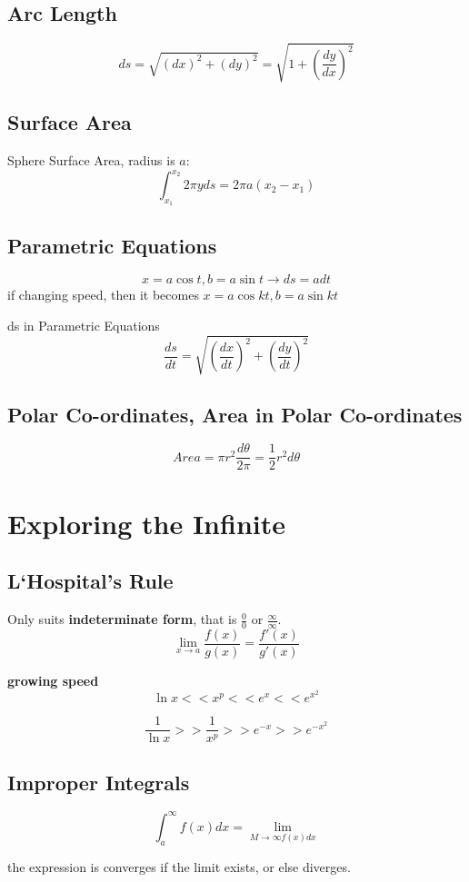 \documentclass{article}
\newcommand\limitx[1]{\lim_{x \to #1}}
\begin{document}
\subsection{Arc Length}

$$ds = \sqrt{(dx)^2 + (dy)^2} = \sqrt{1 + (\frac{dy}{dx})^2}$$

\subsection{Surface Area}
Sphere Surface Area, radius is $a$:
$$\int_{x_1}^{x_2} 2\pi yds = 2\pi a(x_2-x_1)$$

\subsection{Parametric Equations}
$$ x = a\cos t, b = a\sin t \rightarrow ds = adt$$
if changing speed, then it becomes $x = a\cos kt, b = a\sin kt$

ds in Parametric Equations
$$\frac{ds}{dt} = \sqrt{(\frac{dx}{dt})^2 + (\frac{dy}{dt})^2}$$

\subsection{Polar Co-ordinates, Area in Polar Co-ordinates}
$$Area = \pi r^2\frac{d\theta}{2\pi} = \frac{1}{2}r^2d\theta$$

\section{Exploring the Infinite}
\subsection{L‘Hospital's Rule}
Only suits \textbf{indeterminate form}, that is $\frac{0}{0}$ or $\frac{\infty}{\infty}$.
$$\limitx{a} \frac{f(x)}{g(x)} = \frac{f'(x)}{g'(x)}$$

\textbf{growing speed}
$$\ln x << x^p << e^x << e^{x^2}$$

$$\frac{1}{\ln x} >> \frac{1}{x^p} >> e^{-x} >> e^{-x^2}$$

\subsection{Improper Integrals}
$$\int_a^\infty f(x)dx = \lim_{M \rightarrow \infty f(x)dx}$$

the expression is converges if the limit exists, or else diverges.
\end{document}
